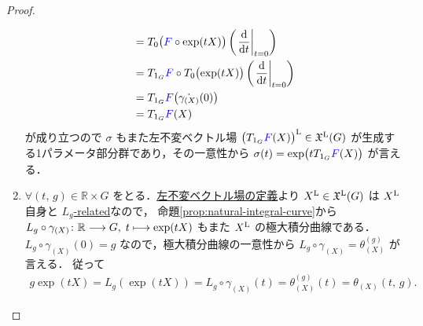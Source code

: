 \documentclass[TQFT_main]{subfiles}
\begin{document}
\begin{proof}
\begin{enumerate}
\begin{align}
            &= T_{0} \bigl( \textcolor{blue}{F} \circ \exp (tX) \bigr) \left( \eval{\dv{}{t}}_{t=0} \right) \\
            &= T_{1_G} \textcolor{blue}{F} \circ T_0 \bigl( \exp (tX)  \bigr)  \left( \eval{\dv{}{t}}_{t=0} \right) \\
            &= T_{1_G} \textcolor{blue}{F} \bigl( \dot{\gamma_{(X)}}(0) \bigr) \\
            &= T_{1_G} \textcolor{blue}{F} (X)
        \end{align}
        が成り立つので $\sigma$ もまた左不変ベクトル場 $\bigl(T_{1_G} \textcolor{blue}{F} (X)\bigr)^{\mathrm{L}} \in \mathfrak{X}^{\mathrm{L}}(G)$  が生成する1パラメータ部分群であり，その一意性から $\sigma(t) = \exp \bigl( t T_{1_G} \textcolor{blue}{F} (X) \bigr)$ が言える．
        \item $\forall (t,\, g) \in \mathbb{R} \times G$ をとる．\hyperref[def:left-invariant]{左不変ベクトル場の定義}より $X^{\mathrm{L}} \in \mathfrak{X}^{\mathrm{L}}(G)$ は $X^{\mathrm{L}}$ 自身と \hyperref[def:F-related]{$L_g$-related}なので，
        命題\ref{prop:natural-integral-curve}から $L_g \circ \gamma_{(X)} \colon \mathbb{R} \longrightarrow G,\; t \longmapsto \exp (tX)$ もまた $X^{\mathrm{L}}$ の極大積分曲線である．$L_g \circ \gamma_{(X)}(0) = g$ なので，極大積分曲線の一意性から $L_g \circ \gamma_{(X)} = \theta_{(X)}^{(g)}$ が言える．
        従って
        \begin{align}
            g \exp(tX) = L_g(\exp(tX)) = L_g \circ \gamma_{(X)}(t) = \theta_{(X)}^{(g)}(t) = \theta_{(X)} (t,\, g).
        \end{align}
    \end{enumerate}
\end{proof}
\end{document}
